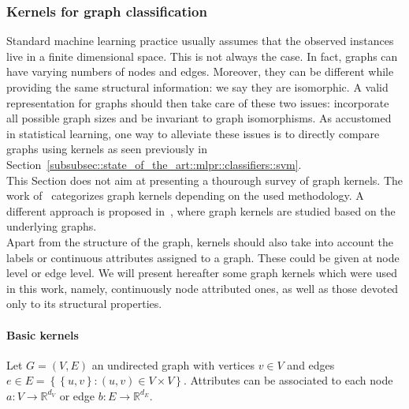         \subsubsection{Kernels for graph classification}
            \label{subsubsec::state_of_the_art::mlpr::feature_extraction::graph_classification}
            Standard machine learning practice usually assumes that the observed instances live in a finite dimensional space.
            This is not always the case.
            In fact, graphs can have varying numbers of nodes and edges.
            Moreover, they can be different while providing the same structural information: we say they are isomorphic.
            A valid representation for graphs should then take care of these two issues: incorporate all possible graph sizes and be invariant to graph isomorphisms.
            As accustomed in statistical learning, one way to alleviate these issues is to directly compare graphs using kernels as seen previously in Section~\ref{subsubsec::state_of_the_art::mlpr::classifiers::svm}.\\
            
            This Section does not aim at presenting a thourough survey of graph kernels.
            The work of~\textcite{ghosh2018journey} categorizes graph kernels depending on the used methodology.
            A different approach is proposed in~\textcite{kriege2019survey}, where graph kernels are studied based on the underlying graphs.\\

            Apart from the structure of the graph, kernels should also take into account the labels or continuous attributes assigned to a graph.
            These could be given at node level or edge level.
            We will present hereafter some graph kernels which were used in this work, namely, continuously node attributed ones, as well as those devoted only to its structural properties.\\

            \paragraph{Basic kernels}
                Let $G = \left(V, E\right)$ an undirected graph with vertices $v\in V$ and edges $e \in E =\left\{\left\{u, v\right\}: (u, v) \in V\times V\right\}$.
                Attributes can be associated to each node $a: V \rightarrow \mathbb{R}^{d_V}$ or edge $b: E \rightarrow \mathbb{R}^{d_E}$.\\

